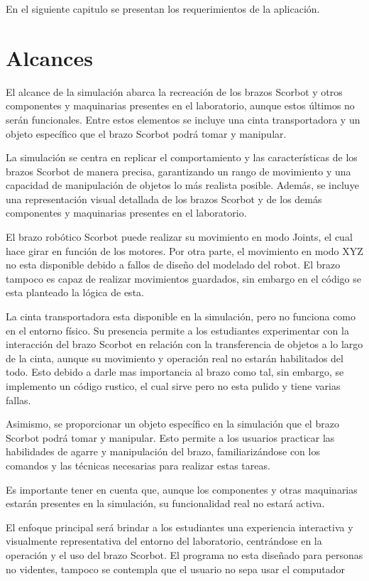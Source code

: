 En el siguiente capitulo se presentan los requerimientos de la aplicación.

\section{Alcances}
El alcance de la simulación abarca la recreación de los brazos Scorbot y otros componentes y maquinarias presentes en el laboratorio, aunque estos últimos no serán funcionales. Entre estos elementos se incluye una cinta transportadora y un objeto específico que el brazo Scorbot podrá tomar y manipular.

La simulación se centra en replicar el comportamiento y las características de los brazos Scorbot de manera precisa, garantizando un rango de movimiento y una capacidad de manipulación de objetos lo más realista posible. Además, se incluye una representación visual detallada de los brazos Scorbot y de los demás componentes y maquinarias presentes en el laboratorio.

El brazo robótico Scorbot puede realizar su movimiento en modo Joints, el cual hace girar en función de los motores. Por otra parte, el movimiento en modo XYZ no esta disponible debido a fallos de diseño del modelado del robot. El brazo tampoco es capaz de realizar movimientos guardados, sin embargo en el código se esta planteado la lógica de esta.

La cinta transportadora esta disponible en la simulación, pero no funciona como en el entorno físico. Su presencia permite a los estudiantes experimentar con la interacción del brazo Scorbot en relación con la transferencia de objetos a lo largo de la cinta, aunque su movimiento y operación real no estarán habilitados del todo. Esto debido a darle mas importancia al brazo como tal, sin embargo, se implemento un código rustico, el cual sirve pero no esta pulido y tiene varias fallas.

Asimismo, se proporcionar un objeto específico en la simulación que el brazo Scorbot podrá tomar y manipular. Esto permite a los usuarios practicar las habilidades de agarre y manipulación del brazo, familiarizándose con los comandos y las técnicas necesarias para realizar estas tareas.

Es importante tener en cuenta que, aunque los componentes y otras maquinarias estarán presentes en la simulación, su funcionalidad real no estará activa. 

El enfoque principal será brindar a los estudiantes una experiencia interactiva y visualmente representativa del entorno del laboratorio, centrándose en la operación y el uso del brazo Scorbot. El programa no esta diseñado para personas no videntes, tampoco se contempla que el usuario no sepa usar el computador

